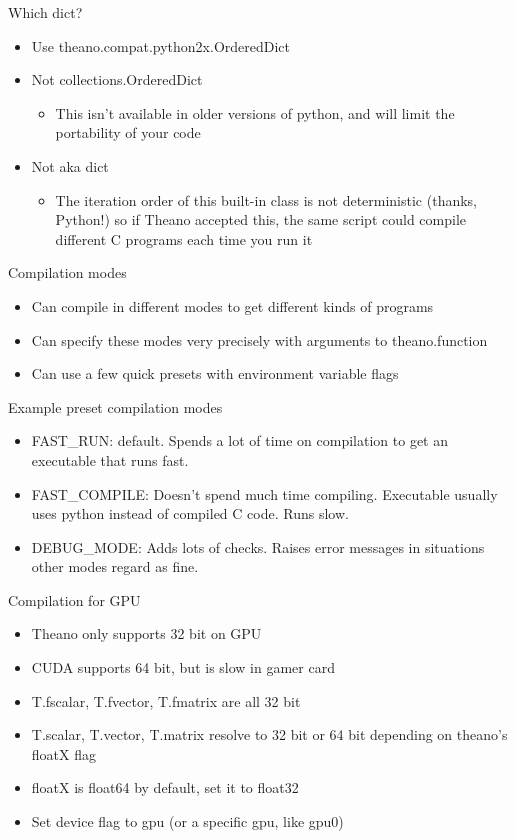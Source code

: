 \documentclass[utf8x,xcolor=pdftex,dvipsnames,table]{beamer}
\begin{document}
\begin{frame}{Which dict?}
  \begin{itemize}
  \item Use theano.compat.python2x.OrderedDict
  \item Not collections.OrderedDict
  \begin{itemize}
  \item This isn’t available in older versions of python,
and will limit the portability of your code
  \end{itemize}
  \item Not {} aka dict
  \begin{itemize}
  \item The iteration order of this built-in class is not
    deterministic (thanks, Python!) so if Theano
    accepted this, the same script could compile
    different C programs each time you run it
  \end{itemize}
  \end{itemize}
\end{frame}

\begin{frame}{Compilation modes}
  \begin{itemize}
  \item Can compile in different modes to get different kinds of programs
  \item Can specify these modes very precisely with arguments to theano.function
  \item Can use a few quick presets with environment variable flags
  \end{itemize}
\end{frame}

\begin{frame}{Example preset compilation modes}
  \begin{itemize}
  \item FAST\_RUN: default. Spends a lot of time on
compilation to get an executable that runs
fast.
  \item FAST\_COMPILE: Doesn’t spend much time
compiling. Executable usually uses python
instead of compiled C code. Runs slow.
  \item DEBUG\_MODE: Adds lots of checks.
Raises error messages in situations other
modes regard as fine.
  \end{itemize}
\end{frame}

\begin{frame}{Compilation for GPU}
  \begin{itemize}
  \item Theano only supports 32 bit on GPU
  \item CUDA supports 64 bit, but is slow in gamer card
  \item T.fscalar, T.fvector, T.fmatrix are all 32 bit
  \item T.scalar, T.vector, T.matrix resolve to 32 bit or 64 bit depending on theano’s floatX flag
  \item floatX is float64 by default, set it to float32
  \item Set device flag to gpu (or a specific gpu, like gpu0)
  \end{itemize}
\end{frame}
\end{document}
